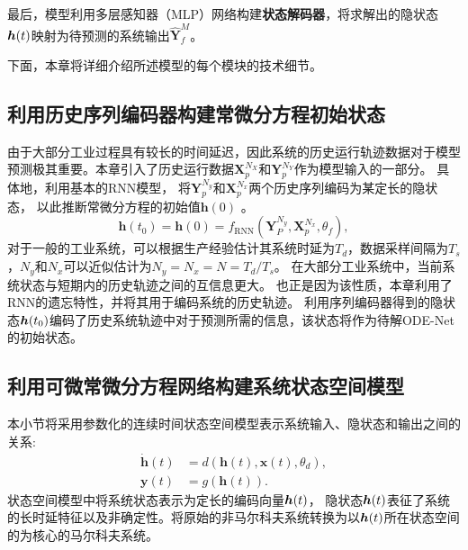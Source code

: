 最后，模型利用多层感知器（MLP）网络构建\textbf{状态解码器}，将求解出的隐状态$\boldsymbol h(t)$映射为待预测的系统输出$\hat{\boldsymbol{Y}}_{f}^{M}$。

下面，本章将详细介绍所述模型的每个模块的技术细节。


\subsection{利用历史序列编码器构建常微分方程初始状态}
由于大部分工业过程具有较长的时间延迟，因此系统的历史运行轨迹数据对于模型预测极其重要。本章引入了历史运行数据$\boldsymbol {X}_{p}^{N_{X}}$和$\boldsymbol {Y}_{p}^{N_{Y}}$作为模型输入的一部分。
具体地，利用基本的RNN模型，
将$\boldsymbol{Y}_p^{N_y}$和$\boldsymbol {X}_p^{N_x}$两个历史序列编码为某定长的隐状态，
以此推断常微分方程的初始值$\boldsymbol{h}(0)$ 。
\begin{equation}
\label{equ:rnn_encoder}
 \boldsymbol{h}(t_0) = \boldsymbol{h}(0) = f_{\text{RNN}}(\boldsymbol{Y}_P^{N_y},\boldsymbol X_p^{N_x},\theta _f),
\end{equation}
对于一般的工业系统，可以根据生产经验估计其系统时延为$T_d$，数据采样间隔为$T_s$，$N_y$和$N_x$可以近似估计为$N_y = N_x = N = T_d/T_s$。
在大部分工业系统中，当前系统状态与短期内的历史轨迹之间的互信息更大。
也正是因为该性质，本章利用了RNN的遗忘特性，并将其用于编码系统的历史轨迹。
利用序列编码器得到的隐状态$\boldsymbol h(t_0)$编码了历史系统轨迹中对于预测所需的信息，该状态将作为待解ODE-Net的初始状态。

\subsection{利用可微常微分方程网络构建系统状态空间模型}
\label{sec:ODE-Net}
本小节将采用参数化的连续时间状态空间模型表示系统输入、隐状态和输出之间的关系:
\begin{equation}
    \begin{aligned}
     \dot{\boldsymbol h}(t)&=d(\boldsymbol{h}(t), \boldsymbol{x}(t), \theta _d),\\
\boldsymbol{y}(t)&=g(\boldsymbol{h}(t)).
    \end{aligned}
    \label{equ:ct_state_space}
\end{equation}
状态空间模型中将系统状态表示为定长的编码向量$\boldsymbol h(t)$，
隐状态$\boldsymbol h(t)$表征了系统的长时延特征以及非确定性。将原始的非马尔科夫系统转换为以$\boldsymbol h(t)$所在状态空间的为核心的马尔科夫系统。

